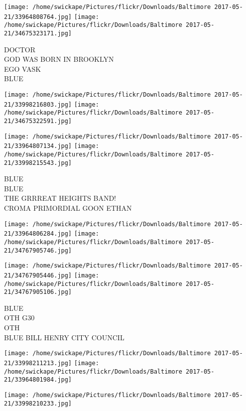 \documentclass[10pt,letterpaper]{article}
\begin{document}
\texttt{[image: /home/swickape/Pictures/flickr/Downloads/Baltimore 2017-05-21/33964808764.jpg]}
\texttt{[image: /home/swickape/Pictures/flickr/Downloads/Baltimore 2017-05-21/34675323171.jpg]}

DOCTOR\\
GOD WAS BORN IN BROOKLYN\\
EGO VASK\\
BLUE\\
\pagebreak

\texttt{[image: /home/swickape/Pictures/flickr/Downloads/Baltimore 2017-05-21/33998216803.jpg]}
\texttt{[image: /home/swickape/Pictures/flickr/Downloads/Baltimore 2017-05-21/34675322591.jpg]}

\texttt{[image: /home/swickape/Pictures/flickr/Downloads/Baltimore 2017-05-21/33964807134.jpg]}
\texttt{[image: /home/swickape/Pictures/flickr/Downloads/Baltimore 2017-05-21/33998215543.jpg]}

BLUE\\
BLUE\\
THE GRRREAT HEIGHTS BAND!\\
CROMA PRIMORDIAL GOON ETHAN\\
\pagebreak

\texttt{[image: /home/swickape/Pictures/flickr/Downloads/Baltimore 2017-05-21/33964806284.jpg]}
\texttt{[image: /home/swickape/Pictures/flickr/Downloads/Baltimore 2017-05-21/34767905746.jpg]}

\texttt{[image: /home/swickape/Pictures/flickr/Downloads/Baltimore 2017-05-21/34767905446.jpg]}
\texttt{[image: /home/swickape/Pictures/flickr/Downloads/Baltimore 2017-05-21/34767905106.jpg]}

BLUE\\
OTH G30\\
OTH\\
BLUE BILL HENRY CITY COUNCIL\\
\pagebreak

\texttt{[image: /home/swickape/Pictures/flickr/Downloads/Baltimore 2017-05-21/33998211213.jpg]}
\texttt{[image: /home/swickape/Pictures/flickr/Downloads/Baltimore 2017-05-21/33964801984.jpg]}

\vspace{0.25in}
\texttt{[image: /home/swickape/Pictures/flickr/Downloads/Baltimore 2017-05-21/33998210233.jpg]}
\end{document}
